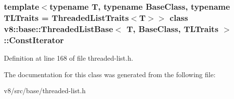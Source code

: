 \subsubsection*{template$<$typename T, typename Base\+Class, typename T\+L\+Traits = Threaded\+List\+Traits$<$\+T$>$$>$\newline
class v8\+::base\+::\+Threaded\+List\+Base$<$ T, Base\+Class, T\+L\+Traits $>$\+::\+Const\+Iterator}



Definition at line 168 of file threaded-\/list.\+h.



The documentation for this class was generated from the following file\+:\begin{DoxyCompactItemize}
\item 
v8/src/base/threaded-\/list.\+h\end{DoxyCompactItemize}
